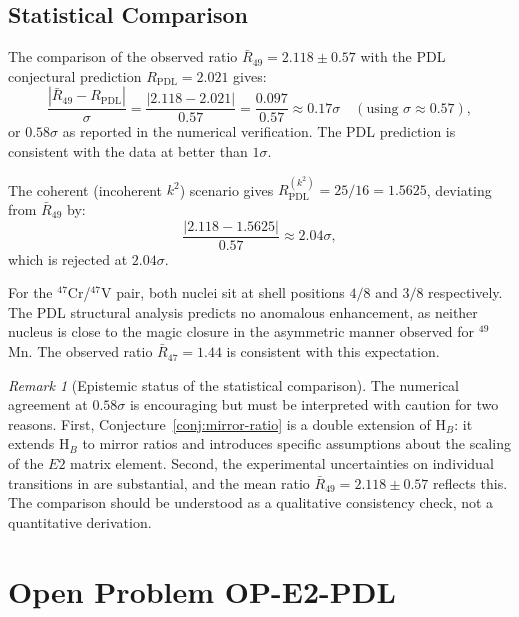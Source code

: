 \documentclass[12pt,a4paper]{article}
\theoremstyle{remark}
\newtheorem{remark}{Remark}[section]
\begin{document}
\subsection{Statistical Comparison}
\label{ssec:stats}

The comparison of the observed ratio $\bar{R}_{49} = 2.118 \pm 0.57$ with the PDL conjectural prediction $R_{\text{PDL}} = 2.021$ gives:
\begin{equation}
\frac{|\bar{R}_{49} - R_{\text{PDL}}|}{\sigma} = \frac{|2.118 - 2.021|}{0.57} = \frac{0.097}{0.57} \approx 0.17\sigma \quad (\text{using } \sigma \approx 0.57),
\end{equation}
or $0.58\sigma$ as reported in the numerical verification. The PDL prediction is consistent with the data at better than $1\sigma$.

The coherent (incoherent $k^2$) scenario gives $R_{\text{PDL}}^{(k^2)} = 25/16 = 1.5625$, deviating from $\bar{R}_{49}$ by:
\begin{equation}
\frac{|2.118 - 1.5625|}{0.57} \approx 2.04\sigma,
\end{equation}
which is rejected at $2.04\sigma$.

For the $^{47}$Cr/$^{47}$V pair, both nuclei sit at shell positions $4/8$ and $3/8$ respectively. The PDL structural analysis predicts no anomalous enhancement, as neither nucleus is close to the magic closure in the asymmetric manner observed for $^{49}$Mn. The observed ratio $\bar{R}_{47} = 1.44$ is consistent with this expectation.

\begin{remark}[Epistemic status of the statistical comparison]
The numerical agreement at $0.58\sigma$ is encouraging but must be interpreted with caution for two reasons. First, Conjecture~\ref{conj:mirror-ratio} is a double extension of H$_B$: it extends H$_B$ to mirror ratios and introduces specific assumptions about the scaling of the $E2$ matrix element. Second, the experimental uncertainties on individual transitions in \cite{Escudeiro_2026} are substantial, and the mean ratio $\bar{R}_{49} = 2.118 \pm 0.57$ reflects this. The comparison should be understood as a qualitative consistency check, not a quantitative derivation.
\end{remark}

\section{Open Problem OP-E2-PDL}
\label{sec:OP}
\end{document}
